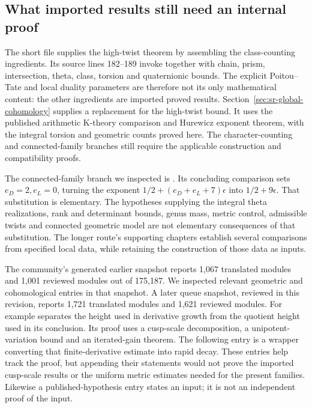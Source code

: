 \subsection{What imported results still need an internal proof}
The short file supplies the high-twist theorem by assembling the
class-counting ingredients. Its source lines 182--189 invoke
 together with chain, prism, intersection,
theta, class, torsion and quaternionic bounds.
The explicit Poitou--Tate and local duality parameters are therefore
not its only mathematical content: the other ingredients are
imported proved results. Section~\ref{sec:sr-global-cohomology} supplies a replacement for the
high-twist bound. It uses the published arithmetic K-theory comparison
and Hurewicz exponent theorem, with the integral torsion and geometric
counts proved here. The character-counting and connected-family
branches still require the applicable construction and compatibility
proofs.

The connected-family branch we inspected is
\href{https://github.com/ChristianKudeba/alpoge-rh-verification/blob/alpoge-source-7cbf7a0c/src/Development/AutomorphicArithmetic/ThetaCorrespondence/ThetaPairLifts/ThirdPlaceSeries/TopShape.lean}{}.
Its concluding comparison sets \(e_D=2,e_L=0\), turning the
exponent \(1/2+(e_D+e_L+7)\epsilon\) into \(1/2+9\epsilon\).
That substitution is elementary.
The hypotheses supplying the integral theta realizations, rank and
determinant bounds, genus mass, metric control, admissible twists and
connected geometric model are not elementary consequences of that
substitution. The longer route's supporting chapters establish several
comparisons from specified local data, while retaining the construction
of those data as inputs.

The community's generated
\href{https://principia-math.com/projects/d16ab288ed353bc5b10e292ace0ddbc1/editor?file=fd6fc09854184b61bca8dd800a4859b5}{}
earlier snapshot reports 1,067 translated modules and 1,001 reviewed modules
out of 175,187. We inspected relevant geometric and cohomological
entries in that snapshot. A later queue snapshot, reviewed in this revision, reports
1,721 translated modules and 1,621 reviewed modules.
For example
 separates the height used in
derivative growth from the quotient height used in its conclusion.
Its proof uses a cusp-scale decomposition, a unipotent-variation bound
and an iterated-gain theorem.
The following  entry is a wrapper converting
that finite-derivative estimate into rapid decay.
These entries help track the proof, but appending their statements
would not prove the imported cusp-scale results or the uniform metric
estimates needed for the present families.
Likewise a published-hypothesis entry states an input; it is not an
independent proof of the input.

